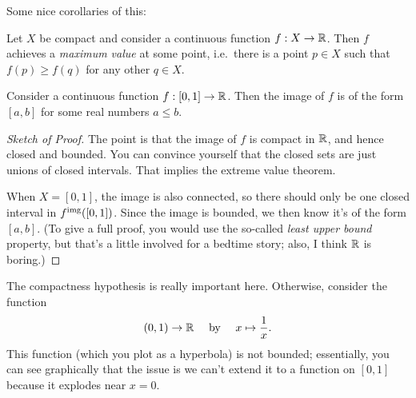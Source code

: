 Some nice corollaries of this:
\begin{corollary}
	Let $X$ be compact and consider a continuous function $f : X \to \mathbb R$.
	Then $f$ achieves a \emph{maximum value} at some point,
	i.e.\ there is a point $p \in X$ such that $f(p) \ge f(q)$ for any
	other $q \in X$.
\end{corollary}
\begin{corollary}
	Consider a continuous function $f: [0,1] \to \mathbb R$.
	Then the image of $f$ is of the form $[a,b]$ for some real numbers $a \le b$.
\end{corollary}

\begin{proof}[Sketch of Proof]
	The point is that the image of $f$ is compact in $\mathbb R$,
	and hence closed and bounded.
	You can convince yourself that the closed sets are just unions of closed intervals.
	That implies the extreme value theorem.

	When $X=[0,1]$, the image is also connected,
	so there should only be one closed interval in $f^{\text{img}}([0,1])$.
	Since the image is bounded, we then know it's of the form $[a,b]$.
	(To give a full proof, you would use the so-called \emph{least upper bound}
	property, but that's a little involved for a bedtime story;
	also, I think $\mathbb R$ is boring.)
\end{proof}

\begin{example}
	[$1/x$]
	The compactness hypothesis is really important here.
	Otherwise, consider the function
	\[ (0,1) \to \mathbb R \quad \text{ by } \quad
		x \mapsto \frac 1x. \]
	This function (which you plot as a hyperbola) is not bounded;
	essentially, you can see graphically that the issue
	is we can't extend it to a function on $[0,1]$ because it explodes near $x=0$.
\end{example}

